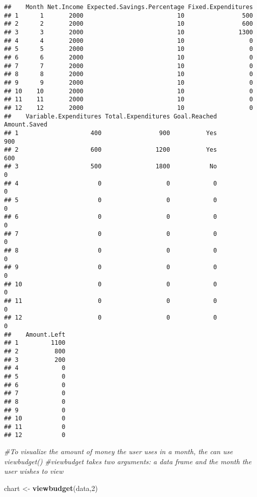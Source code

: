 \documentclass[
]{article}
\newenvironment{Shaded}{\begin{snugshade}}{\end{snugshade}}
\newcommand{\CommentTok}[1]{\textcolor[rgb]{0.56,0.35,0.01}{\textit{#1}}}
\newcommand{\DecValTok}[1]{\textcolor[rgb]{0.00,0.00,0.81}{#1}}
\newcommand{\KeywordTok}[1]{\textcolor[rgb]{0.13,0.29,0.53}{\textbf{#1}}}
\newcommand{\NormalTok}[1]{#1}
\newcommand{\StringTok}[1]{\textcolor[rgb]{0.31,0.60,0.02}{#1}}
\begin{document}
\begin{verbatim}
##    Month Net.Income Expected.Savings.Percentage Fixed.Expenditures
## 1      1       2000                          10                500
## 2      2       2000                          10                600
## 3      3       2000                          10               1300
## 4      4       2000                          10                  0
## 5      5       2000                          10                  0
## 6      6       2000                          10                  0
## 7      7       2000                          10                  0
## 8      8       2000                          10                  0
## 9      9       2000                          10                  0
## 10    10       2000                          10                  0
## 11    11       2000                          10                  0
## 12    12       2000                          10                  0
##    Variable.Expenditures Total.Expenditures Goal.Reached Amount.Saved
## 1                    400                900          Yes          900
## 2                    600               1200          Yes          600
## 3                    500               1800           No            0
## 4                      0                  0            0            0
## 5                      0                  0            0            0
## 6                      0                  0            0            0
## 7                      0                  0            0            0
## 8                      0                  0            0            0
## 9                      0                  0            0            0
## 10                     0                  0            0            0
## 11                     0                  0            0            0
## 12                     0                  0            0            0
##    Amount.Left
## 1         1100
## 2          800
## 3          200
## 4            0
## 5            0
## 6            0
## 7            0
## 8            0
## 9            0
## 10           0
## 11           0
## 12           0
\end{verbatim}

\begin{Shaded}
\begin{Highlighting}[]
\CommentTok{#To visualize the amount of money the user uses in a month, the can use viewbudget()}
\CommentTok{#viewbudget takes two arguments: a data frame and the month the user wishes to view}

\NormalTok{chart <-}\StringTok{ }\KeywordTok{viewbudget}\NormalTok{(data,}\DecValTok{2}\NormalTok{)}
\end{Highlighting}
\end{Shaded}
\end{document}
